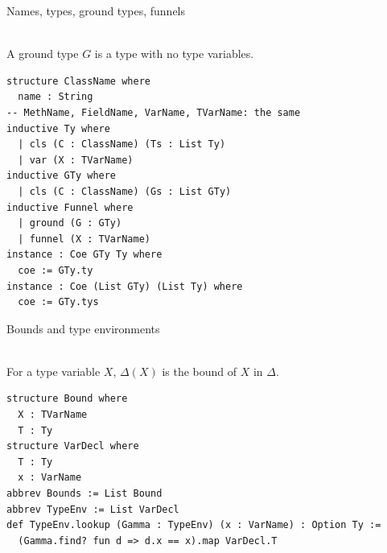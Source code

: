 \begin{cmp}{Names, types, ground types, funnels}
\begin{paperside}
\\[1ex]
A ground type $G$ is a type with no type variables.
\end{paperside}
\begin{leanside}
\begin{lstlisting}[style=leanside]
structure ClassName where
  name : String
-- MethName, FieldName, VarName, TVarName: the same
inductive Ty where
  | cls (C : ClassName) (Ts : List Ty)
  | var (X : TVarName)
inductive GTy where
  | cls (C : ClassName) (Gs : List GTy)
inductive Funnel where
  | ground (G : GTy)
  | funnel (X : TVarName)
instance : Coe GTy Ty where
  coe := GTy.ty
instance : Coe (List GTy) (List Ty) where
  coe := GTy.tys
\end{lstlisting}
\end{leanside}
\end{cmp}

\begin{cmp}{Bounds and type environments}
\begin{paperside}
\\[1ex]
For a type variable $X$, $\Delta(X)$ is the bound of $X$ in $\Delta$.
\end{paperside}
\begin{leanside}
\begin{lstlisting}[style=leanside]
structure Bound where
  X : TVarName
  T : Ty
structure VarDecl where
  T : Ty
  x : VarName
abbrev Bounds := List Bound
abbrev TypeEnv := List VarDecl
def TypeEnv.lookup (Gamma : TypeEnv) (x : VarName) : Option Ty :=
  (Gamma.find? fun d => d.x == x).map VarDecl.T
\end{lstlisting}
\end{leanside}
\end{cmp}

